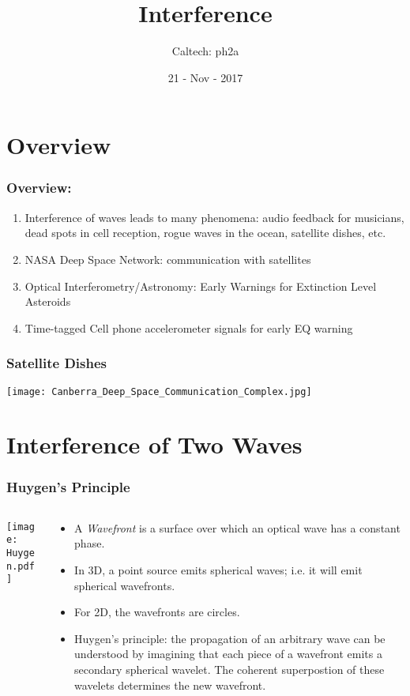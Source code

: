 \documentclass[pdf, hideothersubsections]{beamer}
\begin{document}
\title{Interference}  
\author{Caltech: ph2a}
\date{21 - Nov - 2017}


\frame{\titlepage} 



\section{Overview}
\begin{frame}
\frametitle{Overview:}
\begin{enumerate}
  \pause
\item Interference of waves leads to many phenomena: audio feedback
  for musicians, dead spots in cell reception, rogue waves in the
  ocean, satellite dishes, etc.
\pause
\item NASA Deep Space Network: communication with satellites
\pause
\item Optical Interferometry/Astronomy: Early Warnings for Extinction
  Level Asteroids
\pause
\item Time-tagged Cell phone accelerometer signals for early EQ warning

\end{enumerate}
\end{frame}

\begin{frame}
\frametitle{Satellite Dishes}
\texttt{[image: Canberra\_Deep\_Space\_Communication\_Complex.jpg]}

\end{frame}


\section{Interference of Two Waves}
\begin{frame}
\frametitle{Huygen's Principle}
\begin{columns}
  \begin{column}{0.3\textwidth}
    \texttt{[image: Huygen.pdf]}
  \end{column}

  \begin{column}{0.7\textwidth}
    \begin{itemize}
    \item A \emph{Wavefront} is a surface over which an optical wave has a
      constant phase.
      \pause
    \item In 3D, a point source emits spherical waves; i.e. it will emit
      spherical wavefronts.
      \pause
    \item For 2D, the wavefronts are circles.
      \pause
    \item Huygen's principle: the propagation of an arbitrary wave can be
      understood by imagining that each piece of a wavefront emits a
      secondary spherical wavelet. \pause The coherent superpostion of
      these wavelets determines the new wavefront.
    \end{itemize}
  \end{column}
\end{columns}
\end{frame}
\end{document}
